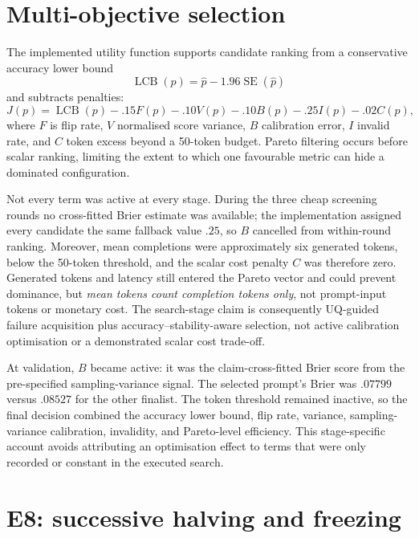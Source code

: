 \documentclass[11pt,twoside,a4paper]{report}
\begin{document}
\section{Multi-objective selection}

The implemented utility function supports candidate ranking from a conservative
accuracy lower bound
\begin{equation}
  \operatorname{LCB}(p)=\widehat p-1.96\operatorname{SE}(\widehat p)
\end{equation}
and subtracts penalties:
\begin{equation}
  J(p)=\operatorname{LCB}(p)-.15F(p)-.10V(p)-.10B(p)
  -.25I(p)-.02C(p),
  \label{eq:apo-objective}
\end{equation}
where $F$ is flip rate, $V$ normalised score variance, $B$ calibration error, $I$
invalid rate, and $C$ token excess beyond a 50-token budget.  Pareto filtering occurs
before scalar ranking, limiting the extent to which one favourable metric can hide a
dominated configuration.

Not every term was active at every stage.  During the three cheap screening rounds
no cross-fitted Brier estimate was available; the implementation assigned every
candidate the same fallback value $.25$, so $B$ cancelled from within-round ranking.
Moreover, mean completions were approximately six generated tokens, below the
50-token threshold, and the scalar cost penalty $C$ was therefore zero.  Generated
tokens and latency still entered the Pareto vector and could prevent dominance, but
\emph{mean tokens count completion tokens only}, not prompt-input tokens or monetary
cost.  The search-stage claim is consequently UQ-guided failure acquisition plus
accuracy--stability-aware selection, not active calibration optimisation or a
demonstrated scalar cost trade-off.

At validation, $B$ became active: it was the claim-cross-fitted Brier score from the
pre-specified sampling-variance signal.  The selected prompt's Brier was $.07799$
versus $.08527$ for the other finalist.  The token threshold remained inactive, so
the final decision combined the accuracy lower bound, flip rate, variance,
sampling-variance calibration, invalidity, and Pareto-level efficiency.  This
stage-specific account avoids attributing an optimisation effect to terms that were
only recorded or constant in the executed search.

\section{E8: successive halving and freezing}
\end{document}
